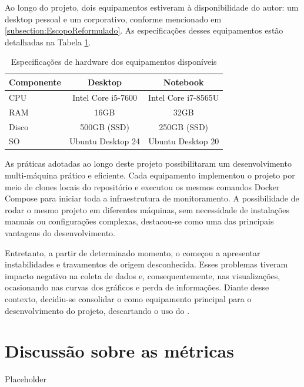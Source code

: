 {\color{red}

Ao longo do projeto, dois equipamentos estiveram à disponibilidade do autor: um desktop pessoal e um  corporativo, conforme mencionado em \ref{subsection:EscopoReformulado}. As especificações desses equipamentos estão detalhadas na Tabela \ref{tab:available-hardware}.
}
\begin{table}[H]
\centering
\caption{Especificações de hardware dos equipamentos disponíveis}
\label{tab:available-hardware}
\begin{tabular}{lcc}
\toprule
\textbf{Componente} & \textbf{Desktop} & \textbf{Notebook} \\
\midrule
CPU   & Intel Core i5-7600   & Intel Core i7-8565U \\
RAM   & 16GB                 & 32GB                \\
Disco & 500GB (SSD)            & 250GB (SSD)          \\
SO & Ubuntu Desktop 24 & Ubuntu Desktop 20 \\
\bottomrule
\end{tabular}
\end{table}

{\color{red}

As práticas adotadas ao longo deste projeto possibilitaram um desenvolvimento multi-máquina prático e eficiente. Cada equipamento implementou o projeto por meio de clones locais do repositório e executou os mesmos comandos Docker Compose para iniciar toda a infraestrutura de monitoramento. A possibilidade de rodar o mesmo projeto em diferentes máquinas, sem necessidade de instalações manuais ou configurações complexas, destacou-se como uma das principais vantagens do desenvolvimento.

Entretanto, a partir de determinado momento, o  começou a apresentar instabilidades e travamentos de origem desconhecida. Esses problemas tiveram impacto negativo na coleta de dados e, consequentemente, nas visualizações, ocasionando  nas curvas dos gráficos e perda de informações. Diante desse contexto, decidiu-se consolidar o  como equipamento principal para o desenvolvimento do projeto, descartando o uso do .
}
\section{Discussão sobre as métricas}

Placeholder



